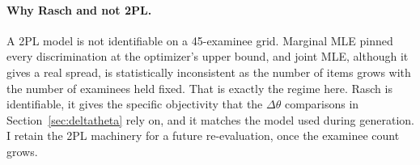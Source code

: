 \paragraph{Why Rasch and not 2PL.}
A 2PL model is not identifiable on a 45-examinee grid. Marginal MLE
pinned every discrimination at the optimizer's upper bound, and joint
MLE, although it gives a real spread, is statistically inconsistent as
the number of items grows with the number of examinees held fixed. That
is exactly the regime here. Rasch is identifiable, it gives the specific
objectivity that the $\Delta\theta$ comparisons in
Section~\ref{sec:deltatheta} rely on, and it matches the model used
during generation. I retain the 2PL machinery for a future
re-evaluation, once the examinee count grows.
